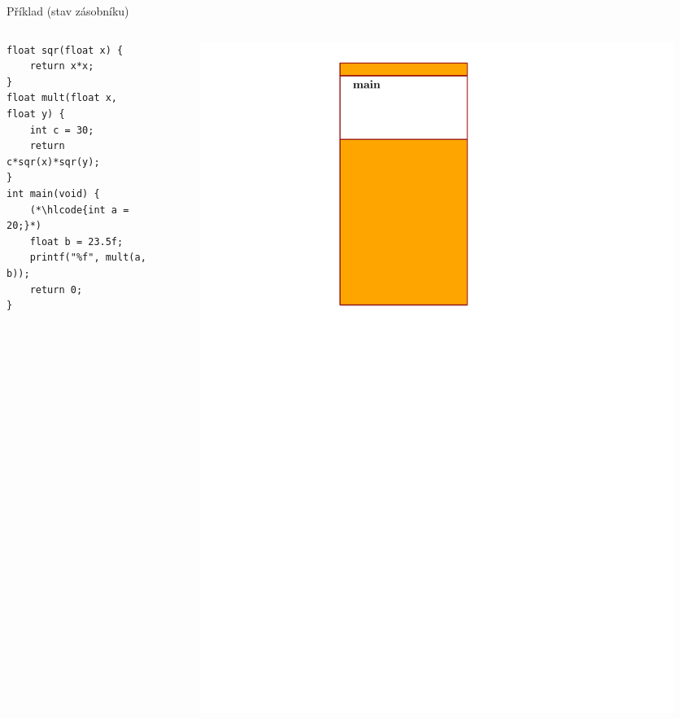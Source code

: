 \documentclass[14pt,aspectratio=169]{beamer}
\begin{document}
    \begin{frame}[t,fragile]{Příklad (stav zásobníku)}
        \begin{columns}[onlytextwidth]
            \begin{column}{0.55\textwidth}
                \begin{lstlisting}
float sqr(float x) {
    return x*x;
}
float mult(float x, float y) {
    int c = 30;
    return c*sqr(x)*sqr(y);
}
int main(void) {
    (*\hlcode{int a = 20;}*)
    float b = 23.5f;
    printf("%f", mult(a, b));
    return 0;
}
                \end{lstlisting}
            \end{column}
            \begin{column}{0.4\textwidth}
                \begin{figure}
                    \centering
                    \includegraphics[scale=.6]{images/zasobnik_stav_1.pdf}
                \end{figure}
            \end{column}
        \end{columns}
    \end{frame}
\end{document}
